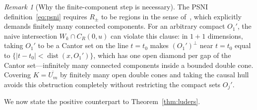\documentclass[11pt,a4paper]{article}
\theoremstyle{definition}
\theoremstyle{remark}
\newtheorem{remark}[theorem]{Remark}
\newcommand{\dist}{\operatorname{dist}}
\begin{document}
\begin{remark}[Why the finite-component step is necessary]\label{rem:cantor}
The PSNI definition~\eqref{eq:psni} requires $R_\pm$ to be regions in the sense of~\cite[Sec.~II.A]{Mandrysch2026}, which explicitly demands finitely many connected components. For an arbitrary compact $O_1'$, the naive intersection $W_k\cap C_R(0,u)$ can violate this clause: in $1+1$ dimensions, taking $O_1'$ to be a Cantor set on the line $t=t_0$ makes $(O_1')^\perp$ near $t=t_0$ equal to $\{|t-t_0| < \dist(x,O_1')\}$, which has one open diamond per gap of the Cantor set---infinitely many connected components inside a bounded double cone. Covering $K=\overline{U_m}$ by finitely many open double cones and taking the causal hull avoids this obstruction completely without restricting the compact sets $O_j'$.
\end{remark}

We now state the positive counterpart to Theorem~\ref{thm:luders}.
\end{document}
